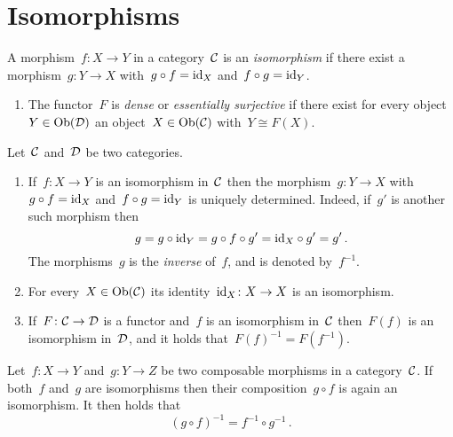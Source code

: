\section{Isomorphisms}


\begin{definition}
  A morphism~$f \colon X \to Y$ in a category~$\mathcal{C}$ is an \emph{isomorphism} if there exist a morphism~$g \colon Y \to X$ with~$g \circ f = \operatorname{id}_X$ and~$f \circ g = \operatorname{id}_Y$.
\end{definition}


\begin{definition}[continues=properties of functors]
  \leavevmode
  \begin{enumerate}[start=4]
    \item
      The functor~$F$ is \emph{dense} or \emph{essentially surjective} if there exist for every object~$Y \in \operatorname{Ob}(\mathcal{D})$ an object~$X \in \operatorname{Ob}(\mathcal{C})$ with~$Y \cong F(X)$.
  \end{enumerate}
\end{definition}


\begin{remark}
  Let~$\mathcal{C}$ and~$\mathcal{D}$ be two categories.
  \begin{enumerate}
    \item
      If~$f \colon X \to Y$ is an isomorphism in~$\mathcal{C}$ then the morphism~$g \colon Y \to X$ with~$g \circ f = \operatorname{id}_X$ and~$f \circ g = \operatorname{id}_Y$ is uniquely determined.
      Indeed, if~$g'$ is another such morphism then
      \[
        g
        =
        g \circ {\operatorname{id}_Y}
        =
        g \circ f \circ g'
        =
        {\operatorname{id}_X} \circ g'
        =
        g'  \,.
      \]
      The morphisms~$g$ is the \emph{inverse} of~$f$, and is denoted by~$f^{-1}$.
    \item
      For every~$X \in \operatorname{Ob}(\mathcal{C})$ its identity~$\operatorname{id}_X \colon X \to X$ is an isomorphism.
    \item
      If~$F \colon \mathcal{C} \to \mathcal{D}$ is a functor and~$f$ is an isomorphism in~$\mathcal{C}$ then~$F(f)$ is an isomorphism in~$\mathcal{D}$, and it holds that~$F(f)^{-1} = F(f^{-1})$.
  \end{enumerate}
\end{remark}


\begin{remark*}
  Let~$f \colon X \to Y$ and~$g \colon Y \to Z$ be two composable morphisms in a category~$\mathcal{C}$.
  If both~$f$ and~$g$ are isomorphisms then their composition~$g \circ f$ is again an isomorphism.
  It then holds that
  \[
    (g \circ f)^{-1}
    =
    f^{-1} \circ g^{-1} \,.
  \]
\end{remark*}


